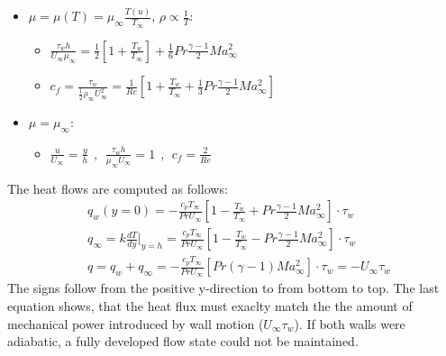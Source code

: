 \documentclass[8pt, landscape, fleqn]{scrartcl}
\begin{document}
\begin{multicols*}{3}
\begin{itemize}
    \item $\mu = \mu(T) = \mu_\infty \frac{T(u)}{T_\infty}$, $\rho \propto \frac{1}{T}$:
    \begin{itemize}
        \item $\frac{\tau_w h}{U_\infty \mu_\infty} = \frac{1}{2}\left[ 1 + \frac{T_w}{T_\infty} \right] + \frac{1}{6}Pr \frac{\gamma-1}{2}Ma_\infty^2$
        \item $c_f = \frac{\tau_w}{\frac{1}{2}\rho_\infty U_\infty^2} = \frac{1}{Re}\left[  1 + \frac{T_w}{T_\infty} + \frac{1}{3}Pr \frac{\gamma-1}{2}Ma_\infty^2 \right]$ 
    \end{itemize}
    \item $\mu = \mu_\infty$:
    \begin{itemize}
        \item $\frac{u}{U_\infty} = \frac{y}{h}~~,~~ \frac{\tau_w h}{\mu_\infty U_\infty} = 1~~,~~ c_f = \frac{2}{Re}$
    \end{itemize}
\end{itemize}
The heat flows are computed as follows:
\begin{align*}
    &q_w (y=0) = -\frac{c_p T_\infty}{Pr U_\infty}\left[ 1 - \frac{T_w}{T_\infty} + Pr \frac{\gamma-1}{2} Ma_\infty^2 \right] \cdot \tau_w \\
    &q_\infty = k \frac{dT}{dy}\vert_{y=h} = \frac{c_p T_\infty}{Pr U_\infty}\left[ 1 - \frac{T_w}{T_\infty}-Pr \frac{\gamma-1}{2}Ma_\infty^2 \right]\cdot \tau_w \\
    &q = q_w + q_\infty = - \frac{c_p T_\infty}{Pr U_\infty}\left[ Pr (\gamma-1) Ma_\infty^2  \right]\cdot \tau_w = - U_\infty \tau_w
\end{align*}
The signs follow from the positive y-direction to from bottom to top. The last equation shows, that the heat flux must exaclty match the the amount of mechanical power introduced by wall motion ($U_\infty \tau_w$). If both walls were adiabatic, a fully developed flow state could not be maintained. \\


\end{multicols*}
\end{document}
